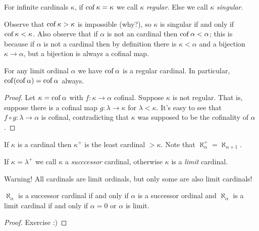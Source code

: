 \documentclass[10pt]{amsart}
\begin{document}
\begin{definition}
For infinite cardinals $\kappa$, if $\operatorname{cof} \kappa = \kappa$ we call $\kappa$ \emph{regular}. Else we call $\kappa$ \emph{singular}.
\end{definition}

Observe that $\operatorname{cof} \kappa > \kappa$ is impossible (why?), so $\kappa$ is singular if and only if $\operatorname{cof} \kappa < \kappa$. Also observe that if $\alpha$ is not an cardinal then $\operatorname{cof} \alpha < \alpha$; this is because if $\alpha$ is not a cardinal then by definition there is $\kappa < \alpha$ and a bijection $\kappa \to \alpha$, but a bijection is always a cofinal map.

\begin{lemma}
For any limit ordinal $\alpha$ we have $\operatorname{cof} \alpha$ is a regular cardinal. In particular, $\operatorname{cof}(\operatorname{cof} \alpha) = \operatorname{cof} \alpha$ always.
\end{lemma}

\begin{proof}
Let $\kappa = \operatorname{cof} \alpha$ with $f : \kappa \to \alpha$ cofinal. Suppose $\kappa$ is not regular. That is, suppose there is a cofinal map $g : \lambda \to \kappa$ for $\lambda < \kappa$. It's easy to see that $f \circ g : \lambda \to \alpha$ is cofinal, contradicting that $\kappa$ was supposed to be the cofinality of $\alpha$.
\end{proof}

\begin{definition}
If $\kappa$ is a cardinal then $\kappa^+$ is the least cardinal $> \kappa$. Note that $\aleph_\alpha^+ = \aleph_{\alpha+1}$.
\end{definition}

\begin{definition}
If $\kappa = \lambda^+$ we call $\kappa$ a \emph{succcessor} cardinal, otherwise $\kappa$ is a \emph{limit} cardinal.
\end{definition}

Warning! All cardinals are limit ordinals, but only some are also limit cardinals!

\begin{proposition}
$\aleph_\alpha$ is a successor cardinal if and only if $\alpha$ is a successor ordinal and $\aleph_\alpha$ is a limit cardinal if and only if $\alpha = 0$ or $\alpha$ is limit.
\end{proposition}

\begin{proof}
Exercise :)
\end{proof}
\end{document}

